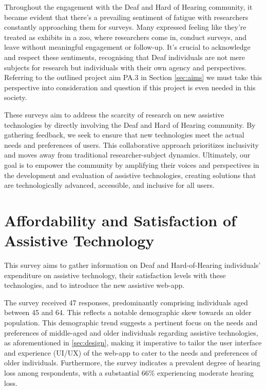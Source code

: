 \documentclass{l4proj}
\begin{document}
Throughout the engagement with the Deaf and Hard of Hearing community, it became evident that there's a prevailing sentiment of fatigue with researchers constantly approaching them for surveys. Many expressed feeling like they're treated as exhibits in a zoo, where researchers come in, conduct surveys, and leave without meaningful engagement or follow-up. It's crucial to acknowledge and respect these sentiments, recognising that Deaf individuals are not mere subjects for research but individuals with their own agency and perspectives. Referring to the outlined project aim PA.3 in Section \ref{sec:aims} we must take this perspective into consideration and question if this project is even needed in this society.

These surveys aim to address the scarcity of research on new assistive technologies by directly involving the Deaf and Hard of Hearing community. By gathering feedback, we seek to ensure that new technologies meet the actual needs and preferences of users. This collaborative approach prioritizes inclusivity and moves away from traditional researcher-subject dynamics. Ultimately, our goal is to empower the community by amplifying their voices and perspectives in the development and evaluation of assistive technologies, creating solutions that are technologically advanced, accessible, and inclusive for all users.

\section{Affordability and Satisfaction of Assistive Technology}
\label{sec:afford-survey}

This survey aims to gather information on Deaf and Hard-of-Hearing individuals' expenditure on assistive technology, their satisfaction levels with these technologies, and to introduce the new assistive web-app.

The survey received 47 responses, predominantly comprising individuals aged between 45 and 64. This reflects a notable demographic skew towards an older population. This demographic trend suggests a pertinent focus on the needs and preferences of middle-aged and older individuals regarding assistive technologies, as aforementioned in \ref{sec:design}, making it imperative to tailor the user interface and experience (UI/UX) of the web-app to cater to the needs and preferences of older individuals. Furthermore, the survey indicates a prevalent degree of hearing loss among respondents, with a substantial 66\% experiencing moderate hearing loss.
\end{document}

